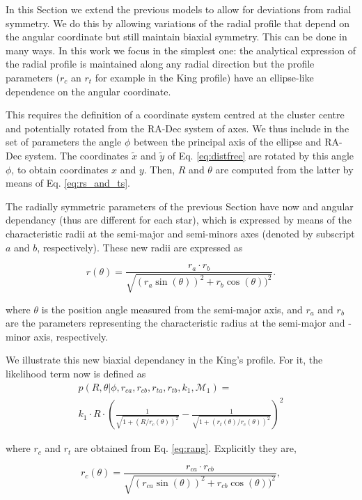 In this Section we extend the previous models to allow for deviations
from radial symmetry. We do this by allowing variations of the radial
profile that depend on the angular coordinate but still maintain
biaxial symmetry. This can be done in many ways. In this work we focus
in the simplest one: the analytical expression of the radial profile
is maintained along any radial direction but the profile parameters
($r_c$ an $r_t$ for example in the King profile) have an ellipse-like
dependence on the angular coordinate.

This requires the definition of a coordinate system centred at the
cluster centre and potentially rotated from the RA-Dec system of
axes. We thus include in the set of parameters the angle $\phi$ between the principal axis of
the ellipse and RA-Dec system. The coordinates $\tilde{x}$ and $\tilde{y}$
of Eq. \ref{eq:distfree} are rotated by this angle $\phi$, to obtain coordinates $x$ and $y$. 
Then, $R$ and $\theta$ are computed from the latter by means of Eq. \ref{eq:rs_and_ts}.

The radially symmetric parameters of the previous Section have now and angular dependancy (thus are different for each star),
which is expressed by means of the characteristic radii at the semi-major and semi-minors axes (denoted by subscript $a$ and $b$, respectively).
These new radii are expressed as

\begin{equation}
r(\theta) = \frac{r_{a}\cdot r_{b}}{\sqrt{(r_{a}\sin(\theta))^2+r_{b}\cos(\theta))^2}}.
\label{eq:rang}
\end{equation}

where $\theta$ is the position angle measured from the semi-major axis, and $r_a$ and $r_b$ are the parameters
representing the characteristic radius at the semi-major and -minor axis, respectively.

We illustrate this new biaxial dependancy in the King's profile. 
For it, the likelihood term now is defined as
\begin{multline}
  p(R,\theta|\phi,r_{ca},r_{cb}, r_{ta},r_{tb}, k_1,\mathcal{M}_1)=\\
  k_1\cdot R \cdot
  \left(\frac{1}{\sqrt{1+({R}/{r_c(\theta)})^2}} - \frac{1}{\sqrt{1+({r_t(\theta)}/{r_c(\theta)})^2}}\right)^2
\label{eq:KingEll}
\end{multline}

where $r_c$ and $r_t$ are obtained from Eq. \ref{eq:rang}. Explicitly they are,

\begin{equation}
r_c(\theta) = \frac{r_{ca}\cdot r_{cb}}{\sqrt{(r_{ca}\sin(\theta))^2+r_{cb}\cos(\theta))^2}},
\label{eq:anglerc}
\end{equation}


